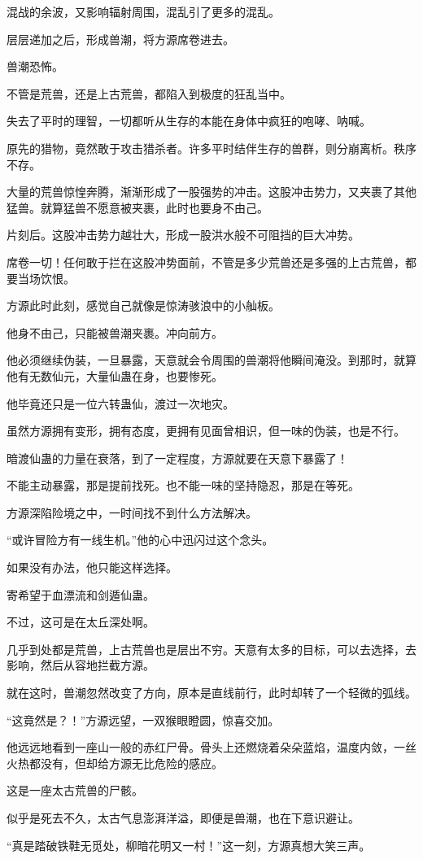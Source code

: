 \begin{this_body}
混战的余波，又影响辐射周围，混乱引了更多的混乱。

层层递加之后，形成兽潮，将方源席卷进去。

兽潮恐怖。

不管是荒兽，还是上古荒兽，都陷入到极度的狂乱当中。

失去了平时的理智，一切都听从生存的本能在身体中疯狂的咆哮、呐喊。

原先的猎物，竟然敢于攻击猎杀者。许多平时结伴生存的兽群，则分崩离析。秩序不存。

大量的荒兽惊惶奔腾，渐渐形成了一股强势的冲击。这股冲击势力，又夹裹了其他猛兽。就算猛兽不愿意被夹裹，此时也要身不由己。

片刻后。这股冲击势力越壮大，形成一股洪水般不可阻挡的巨大冲势。

席卷一切！任何敢于拦在这股冲势面前，不管是多少荒兽还是多强的上古荒兽，都要当场饮恨。

方源此时此刻，感觉自己就像是惊涛骇浪中的小舢板。

他身不由己，只能被兽潮夹裹。冲向前方。

他必须继续伪装，一旦暴露，天意就会令周围的兽潮将他瞬间淹没。到那时，就算他有无数仙元，大量仙蛊在身，也要惨死。

他毕竟还只是一位六转蛊仙，渡过一次地灾。

虽然方源拥有变形，拥有态度，更拥有见面曾相识，但一味的伪装，也是不行。

暗渡仙蛊的力量在衰落，到了一定程度，方源就要在天意下暴露了！

不能主动暴露，那是提前找死。也不能一味的坚持隐忍，那是在等死。

方源深陷险境之中，一时间找不到什么方法解决。

“或许冒险方有一线生机。”他的心中迅闪过这个念头。

如果没有办法，他只能这样选择。

寄希望于血漂流和剑遁仙蛊。

不过，这可是在太丘深处啊。

几乎到处都是荒兽，上古荒兽也是层出不穷。天意有太多的目标，可以去选择，去影响，然后从容地拦截方源。

就在这时，兽潮忽然改变了方向，原本是直线前行，此时却转了一个轻微的弧线。

“这竟然是？！”方源远望，一双猴眼瞪圆，惊喜交加。

他远远地看到一座山一般的赤红尸骨。骨头上还燃烧着朵朵蓝焰，温度内敛，一丝火热都没有，但却给方源无比危险的感应。

这是一座太古荒兽的尸骸。

似乎是死去不久，太古气息澎湃洋溢，即便是兽潮，也在下意识避让。

“真是踏破铁鞋无觅处，柳暗花明又一村！”这一刻，方源真想大笑三声。

\end{this_body}

